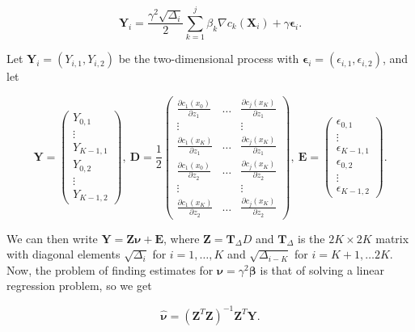 $$
    \textbf{Y}_i = \frac{\gamma^2 \sqrt{\Delta_i}}{2}\sum_{k = 1}^j \beta_k \nabla c_k(\textbf{X}_i) + \gamma \bm \epsilon_i.
$$

Let $\textbf{Y}_i = (Y_{i,1}, Y_{i,2})$ be the two-dimensional process with $\bm \epsilon_i =(\epsilon_{i,1}, \epsilon_{i,2})$, and let

$$
    \mathbf{Y} = \begin{pmatrix}
        Y_{0,1} \\
        \vdots \\
        Y_{K-1,1}\\
        Y_{0,2}\\
        \vdots\\
        Y_{K-1,2}
    \end{pmatrix} , \    
    \mathbf{D} = \frac{1}{2} 
    \begin{pmatrix}
        \frac{\partial c_1(x_0)}{\partial z_1} & \dots & \frac{\partial c_j(x_K)}{\partial z_1} \\
        \vdots & & \vdots \\
        \frac{\partial c_1(x_K)}{\partial z_1} & \dots & \frac{\partial c_j(x_K)}{\partial z_1} \\
        \frac{\partial c_1(x_0)}{\partial z_2} & \dots & \frac{\partial c_j(x_K)}{\partial z_2} \\
        \vdots & & \vdots \\
        \frac{\partial c_1(x_K)}{\partial z_2} & \dots & \frac{\partial c_j(x_K)}{\partial z_2}
    \end{pmatrix} , \
    \mathbf{E} =\begin{pmatrix}
        \epsilon_{0,1} \\
        \vdots \\
        \epsilon_{K-1,1}\\
        \epsilon_{0,2}\\
        \vdots\\
        \epsilon_{K-1,2}
    \end{pmatrix}.
$$


We can then write $\mathbf{Y} = \mathbf{Z} \bm{\nu} + \mathbf{E}$, where $\mathbf{Z} = \mathbf{T}_\Delta D$ and $\mathbf{T}_\Delta$ is the $2K\times 2K$ matrix with diagonal elements $\sqrt{\Delta_i}$ for $i=1, \dots, K$ and $\sqrt{\Delta_{i-K}}$ for $i=K+1,\dots 2K$. Now, the problem of finding estimates for $\bm{\nu} = \gamma^2 \bm{\beta}$ is that of solving a linear regression problem, so we get

$$
\bm{\hat{\nu}} = (\mathbf{Z}^T\mathbf{Z})^{-1}\mathbf{Z}^T \mathbf{Y}.
$$

